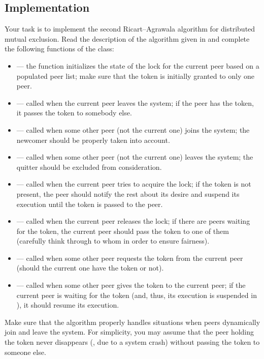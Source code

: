 \documentclass[a4paper]{article}
\begin{document}
\subsection{Implementation}
Your task is to implement the second Ricart--Agrawala algorithm for distributed
mutual exclusion. Read the description of the algorithm given in
\cite{lecture67} and complete the following functions of the
 class:
\begin{itemize}

  \item {} --- the function initializes the state of the lock for
  the current peer based on a populated peer list; make sure that the token is
  initially granted to only one peer.

  \item {} --- called when the current peer leaves the system; if
  the peer has the token, it passes the token to somebody else.

  \item {} --- called when some other peer (not the current
  one) joins the system; the newcomer should be properly taken into account.

  \item {} --- called when some other peer (not the current
  one) leaves the system; the quitter should be excluded from consideration.

  \item {} --- called when the current peer tries to acquire the
  lock; if the token is not present, the peer should notify the rest about its
  desire and suspend its execution until the token is passed to the peer.

  \item {} --- called when the current peer releases the lock; if
  there are peers waiting for the token, the current peer should pass the token
  to one of them (carefully think through to whom in order to ensure fairness).

  \item {} --- called when some other peer requests the token
  from the current peer (should the current one have the token or not).

  \item {} --- called when some other peer gives the token to
  the current peer; if the current peer is waiting for the token (and, thus, its
  execution is suspended in ), it should resume its execution.

\end{itemize}
Make sure that the algorithm properly handles situations when peers dynamically
join and leave the system. For simplicity, you may assume that the peer holding
the token never disappears (\eg, due to a system crash) without passing the
token to someone else.
\end{document}
